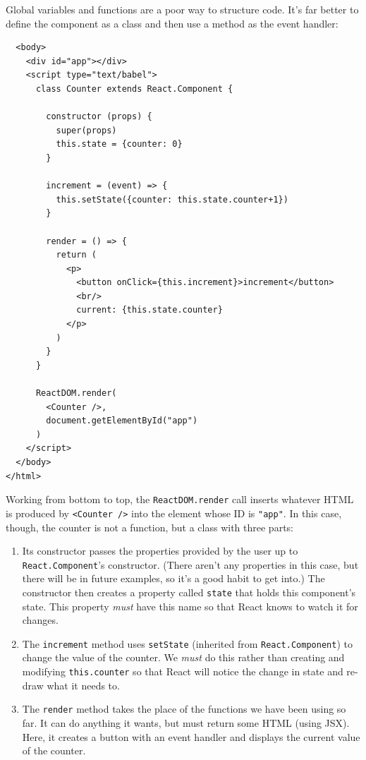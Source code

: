Global variables and functions are a poor way to structure code. It's
far better to define the component as a class and then use a method as
the event handler:

\begin{verbatim}
  <body>
    <div id="app"></div>
    <script type="text/babel">
      class Counter extends React.Component {

        constructor (props) {
          super(props)
          this.state = {counter: 0}
        }

        increment = (event) => {
          this.setState({counter: this.state.counter+1})
        }

        render = () => {
          return (
            <p>
              <button onClick={this.increment}>increment</button>
              <br/>
              current: {this.state.counter}
            </p>
          )
        }
      }

      ReactDOM.render(
        <Counter />,
        document.getElementById("app")
      )
    </script>
  </body>
</html>
\end{verbatim}

Working from bottom to top, the \texttt{ReactDOM.render} call inserts
whatever HTML is produced by
\texttt{\textless{}Counter\ /\textgreater{}} into the element whose ID
is \texttt{"app"}. In this case, though, the counter is not a function,
but a class with three parts:

\begin{enumerate}
\item
  Its constructor passes the properties provided by the user up to
  \texttt{React.Component}'s constructor. (There aren't any properties
  in this case, but there will be in future examples, so it's a good
  habit to get into.) The constructor then creates a property called
  \texttt{state} that holds this component's state. This property
  \emph{must} have this name so that React knows to watch it for
  changes.
\item
  The \texttt{increment} method uses \texttt{setState} (inherited from
  \texttt{React.Component}) to change the value of the counter. We
  \emph{must} do this rather than creating and modifying
  \texttt{this.counter} so that React will notice the change in state
  and re-draw what it needs to.
\item
  The \texttt{render} method takes the place of the functions we have
  been using so far. It can do anything it wants, but must return some
  HTML (using JSX). Here, it creates a button with an event handler and
  displays the current value of the counter.
\end{enumerate}

